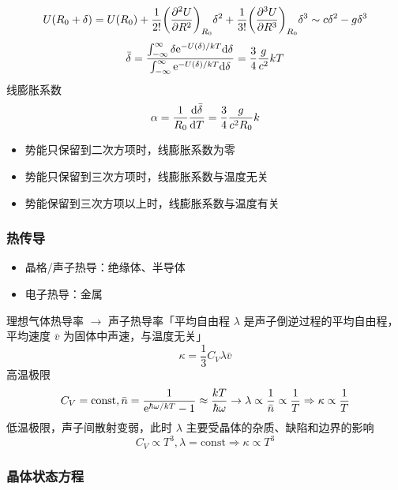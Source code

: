\[ U(R_0 + \delta) = U(R_0) + \frac{1}{2!} \qty(\pdv[2]{U}{R})_{R_0} \delta^2 + \frac{1}{3!} \qty(\pdv[3]{U}{R})_{R_0} \delta^3 \sim c \delta^2 - g \delta^3 \]
\[ \bar{\delta} = \frac{\int_{- \infty}^{\infty} \delta \mathrm{e}^{- U(\delta)/k T} \dd \delta}{\int_{- \infty}^{\infty} \mathrm{e}^{- U(\delta)/k T} \dd \delta} = \frac{3}{4} \frac{g}{c^2} k T \]
线膨胀系数
\[ \alpha = \frac{1}{R_0} \dv{\bar{\delta}}{T} = \frac{3}{4} \frac{g}{c^2 R_0} k \]
\begin{itemize}
    \item 势能只保留到二次方项时，线膨胀系数为零
    \item 势能只保留到三次方项时，线膨胀系数与温度无关
    \item 势能保留到三次方项以上时，线膨胀系数与温度有关
\end{itemize}

\subsubsection{热传导}

\begin{itemize}
    \item 晶格/声子热导：绝缘体、半导体
    \item 电子热导：金属
\end{itemize}
理想气体热导率 $\to$ 声子热导率「平均自由程 $\lambda$ 是声子倒逆过程的平均自由程，平均速度 $\bar{v}$ 为固体中声速，与温度无关」
\[ \kappa = \frac{1}{3} C_V \lambda \bar{v} \]
高温极限
\[ C_V = \text{const}, \bar{n} = \frac{1}{\mathrm{e}^{\hbar \omega / k T} - 1} \approx \frac{k T}{\hbar \omega} \rightarrow \lambda \propto \frac{1}{\bar{n}} \propto \frac{1}{T} \Rightarrow \kappa \propto \frac{1}{T} \]
低温极限，声子间散射变弱，此时 $\lambda$ 主要受晶体的杂质、缺陷和边界的影响
\[ C_V \propto T^3, \lambda = \text{const} \Rightarrow \kappa \propto T^3 \]

\subsubsection{晶体状态方程}

